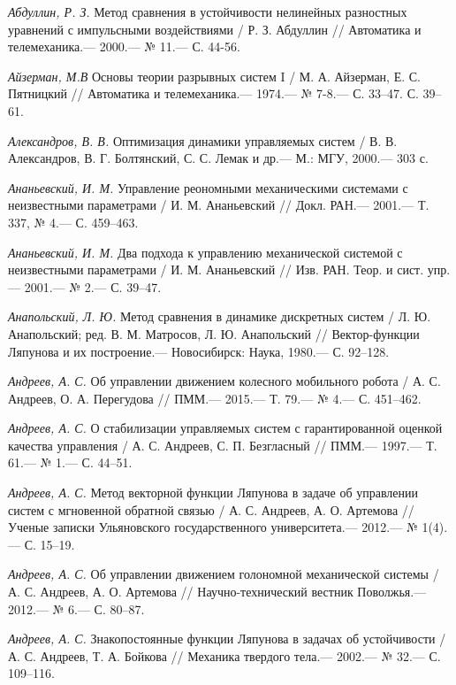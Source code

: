 \begin{thebibliography}{10} \label{bibl}
	{\it Абдуллин, Р. З.} Метод сравнения в устойчивости нелинейных разностных уравнений с импульсными воздействиями
	/ Р. З. Абдуллин // Автоматика и телемеханика.— 2000.— № 11.— С. 44-56. 	
	
	{\it Айзерман, М.В} Основы теории разрывных систем I / М. А. Айзерман, Е. С. Пятницкий
	// Автоматика и телемеханика.— 1974.— № 7-8.— С. 33–47. С. 39–61.
	
	{\it Александров, В. В.} Оптимизация динамики управляемых систем / В. В. Александров, В. Г. Болтянский,
	С. С. Лемак и др.— М.: МГУ, 2000.— 303 с.
	
	{\it Ананьевский, И. М.} Управление реономными механическими системами с неизвестными параметрами /
	И. М. Ананьевский // Докл. РАН.— 2001.— Т. 337, № 4.— С. 459–463.
	
	{\it Ананьевский, И. М.} Два подхода к управлению механической системой с неизвестными параметрами /
	И. М. Ананьевский // Изв. РАН. Теор. и сист. упр.— 2001.— № 2.— С. 39–47.
	
	{\it Анапольский, Л. Ю.} Метод сравнения в динамике дискретных систем /
	Л. Ю. Анапольский; ред. В. М. Матросов, Л. Ю. Анапольский // Вектор-функции Ляпунова и их построение.— Новосибирск: Наука, 1980.— С. 92–128.
	
	{\it Андреев, А. С.} Об управлении движением колесного мобильного робота /
	А. С. Андреев, О. А. Перегудова // ПММ.— 2015.— Т. 79.— № 4.— С. 451–462.
	
	{\it Андреев, А. С.} О стабилизации управляемых систем с гарантированной оценкой качества управления /
	А. С. Андреев, С. П. Безгласный // ПММ.— 1997.— Т. 61.— № 1.— С. 44–51.
	
	{\it Андреев, А. С.} Метод векторной функции Ляпунова в задаче об управлении систем
	с мгновенной обратной связью / А. С. Андреев, А. О. Артемова // Ученые записки
	Ульяновского государственного университета.— 2012.— № 1(4).— С. 15–19.
	
	{\it Андреев, А. С.} Об управлении движением голономной механической системы / А. С. Андреев,
	А. О. Артемова // Научно-технический вестник Поволжья.— 2012.— № 6.— С. 80–87.
	
	{\it Андреев, А. С.} Знакопостоянные функции Ляпунова в задачах об устойчивости /
	А. С. Андреев, Т. А. Бойкова // Механика твердого тела.— 2002.— № 32.— С. 109–116.
	

\end{thebibliography}

